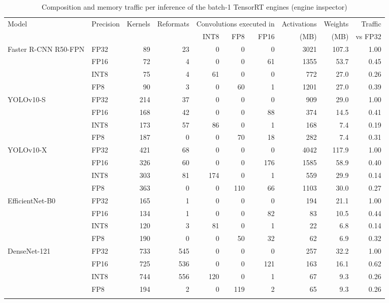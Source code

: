 \begin{table}
\footnotesize\setlength{\tabcolsep}{4pt}
\caption{Composition and memory traffic per inference of the batch-1 TensorRT engines (engine inspector)}\label{tab:engines}
\begin{tabular}{@{}llrrrrrrrr@{}}
\toprule
Model & Precision & Kernels & Reformats & \multicolumn{3}{c}{Convolutions executed in} & Activations & Weights & Traffic \\
\cmidrule{5-7}
 & & & & INT8 & FP8 & FP16 & (MB) & (MB) & vs FP32 \\
\midrule
Faster R-CNN R50-FPN & FP32 & 89 & 23 & 0 & 0 & 0 & 3021 & 107.3 & 1.00 \\
 & FP16 & 72 & 4 & 0 & 0 & 61 & 1355 & 53.7 & 0.45 \\
 & INT8 & 75 & 4 & 61 & 0 & 0 & 772 & 27.0 & 0.26 \\
 & FP8 & 90 & 3 & 0 & 60 & 1 & 1201 & 27.0 & 0.39 \\
\midrule
YOLOv10-S & FP32 & 214 & 37 & 0 & 0 & 0 & 909 & 29.0 & 1.00 \\
 & FP16 & 168 & 42 & 0 & 0 & 88 & 374 & 14.5 & 0.41 \\
 & INT8 & 173 & 57 & 86 & 0 & 1 & 168 & 7.4 & 0.19 \\
 & FP8 & 187 & 0 & 0 & 70 & 18 & 282 & 7.4 & 0.31 \\
\midrule
YOLOv10-X & FP32 & 421 & 68 & 0 & 0 & 0 & 4042 & 117.9 & 1.00 \\
 & FP16 & 326 & 60 & 0 & 0 & 176 & 1585 & 58.9 & 0.40 \\
 & INT8 & 303 & 81 & 174 & 0 & 1 & 559 & 29.9 & 0.14 \\
 & FP8 & 363 & 0 & 0 & 110 & 66 & 1103 & 30.0 & 0.27 \\
\midrule
EfficientNet-B0 & FP32 & 165 & 1 & 0 & 0 & 0 & 194 & 21.1 & 1.00 \\
 & FP16 & 134 & 1 & 0 & 0 & 82 & 83 & 10.5 & 0.44 \\
 & INT8 & 120 & 3 & 81 & 0 & 1 & 22 & 6.8 & 0.14 \\
 & FP8 & 190 & 0 & 0 & 50 & 32 & 62 & 6.9 & 0.32 \\
\midrule
DenseNet-121 & FP32 & 733 & 545 & 0 & 0 & 0 & 257 & 32.2 & 1.00 \\
 & FP16 & 725 & 536 & 0 & 0 & 121 & 163 & 16.1 & 0.62 \\
 & INT8 & 744 & 556 & 120 & 0 & 1 & 67 & 9.3 & 0.26 \\
 & FP8 & 194 & 2 & 0 & 119 & 2 & 65 & 9.3 & 0.26 \\
\botrule
\end{tabular}

\end{table}
